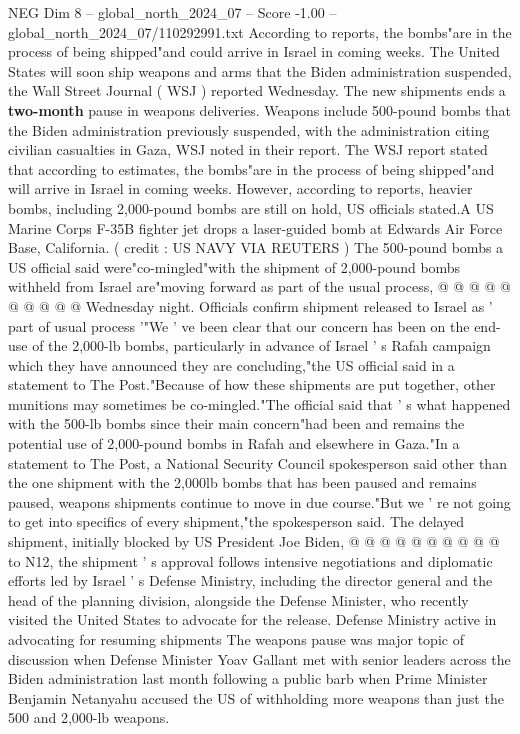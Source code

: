 \begin{textsample}{NEG Dim 8 – global\_north\_2024\_07 – Score -1.00 – global\_north\_2024\_07/110292991.txt}  \label{ex:f8_neg_418}
According to reports, the bombs"are in the process of being shipped"and could arrive in Israel in coming weeks.
The United States will soon ship weapons and arms that the Biden administration suspended, the Wall Street Journal ( WSJ ) reported Wednesday.
The new shipments ends a \textbf{two-month} pause in weapons deliveries.
Weapons include 500-pound bombs that the Biden administration previously suspended, with the administration citing civilian casualties in Gaza, WSJ noted in their report.
The WSJ report stated that according to estimates, the bombs"are in the process of being shipped"and will arrive in Israel in coming weeks.
However, according to reports, heavier bombs, including 2,000-pound bombs are still on hold, US officials stated.A US Marine Corps F-35B fighter jet drops a laser-guided bomb at Edwards Air Force Base, California. ( credit : US NAVY VIA REUTERS ) The 500-pound bombs a US official said were"co-mingled"with the shipment of 2,000-pound bombs withheld from Israel are"moving forward as part of the usual process, @ @ @ @ @ @ @ @ @ @ Wednesday night.
Officials confirm shipment released to Israel as ' part of usual process '"We ' ve been clear that our concern has been on the end-use of the 2,000-lb bombs, particularly in advance of Israel ' s Rafah campaign which they have announced they are concluding,"the US official said in a statement to The Post."Because of how these shipments are put together, other munitions may sometimes be co-mingled."The official said that ' s what happened with the 500-lb bombs since their main concern"had been and remains the potential use of 2,000-pound bombs in Rafah and elsewhere in Gaza."In a statement to The Post, a National Security Council spokesperson said other than the one shipment with the 2,000lb bombs that has been paused and remains paused, weapons shipments continue to move in due course."But we ' re not going to get into specifics of every shipment,"the spokesperson said.
The delayed shipment, initially blocked by US President Joe Biden, @ @ @ @ @ @ @ @ @ @ to N12, the shipment ' s approval follows intensive negotiations and diplomatic efforts led by Israel ' s Defense Ministry, including the director general and the head of the planning division, alongside the Defense Minister, who recently visited the United States to advocate for the release.
Defense Ministry active in advocating for resuming shipments The weapons pause was major topic of discussion when Defense Minister Yoav Gallant met with senior leaders across the Biden administration last month following a public barb when Prime Minister Benjamin Netanyahu accused the US of withholding more weapons than just the 500 and 2,000-lb weapons.

\end{textsample}
